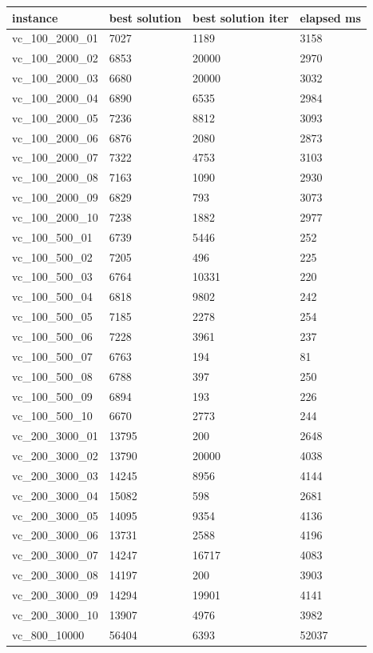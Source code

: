 \documentclass[11pt]{article}
\begin{document}
\begin{table}[!ht]
    \centering
    \begin{tabular}{|l|l|l|l|}
    \hline
        instance & best solution & best solution iter & elapsed ms \\ \hline

        
        vc\_100\_2000\_01 & 7027 & 1189 & 3158 \\ \hline
        vc\_100\_2000\_02 & 6853 & 20000 & 2970 \\ \hline
        vc\_100\_2000\_03 & 6680 & 20000 & 3032 \\ \hline
        vc\_100\_2000\_04 & 6890 & 6535 & 2984 \\ \hline
        vc\_100\_2000\_05 & 7236 & 8812 & 3093 \\ \hline
        vc\_100\_2000\_06 & 6876 & 2080 & 2873 \\ \hline
        vc\_100\_2000\_07 & 7322 & 4753 & 3103 \\ \hline
        vc\_100\_2000\_08 & 7163 & 1090 & 2930 \\ \hline
        vc\_100\_2000\_09 & 6829 & 793 & 3073 \\ \hline
        vc\_100\_2000\_10 & 7238 & 1882 & 2977 \\ \hline
        vc\_100\_500\_01 & 6739 & 5446 & 252 \\ \hline
        vc\_100\_500\_02 & 7205 & 496 & 225 \\ \hline
        vc\_100\_500\_03 & 6764 & 10331 & 220 \\ \hline
        vc\_100\_500\_04 & 6818 & 9802 & 242 \\ \hline
        vc\_100\_500\_05 & 7185 & 2278 & 254 \\ \hline
        vc\_100\_500\_06 & 7228 & 3961 & 237 \\ \hline
        vc\_100\_500\_07 & 6763 & 194 & 81 \\ \hline
        vc\_100\_500\_08 & 6788 & 397 & 250 \\ \hline
        vc\_100\_500\_09 & 6894 & 193 & 226 \\ \hline
        vc\_100\_500\_10 & 6670 & 2773 & 244 \\ \hline
        vc\_200\_3000\_01 & 13795 & 200 & 2648 \\ \hline
        vc\_200\_3000\_02 & 13790 & 20000 & 4038 \\ \hline
        vc\_200\_3000\_03 & 14245 & 8956 & 4144 \\ \hline
        vc\_200\_3000\_04 & 15082 & 598 & 2681 \\ \hline
        vc\_200\_3000\_05 & 14095 & 9354 & 4136 \\ \hline
        vc\_200\_3000\_06 & 13731 & 2588 & 4196 \\ \hline
        vc\_200\_3000\_07 & 14247 & 16717 & 4083 \\ \hline
        vc\_200\_3000\_08 & 14197 & 200 & 3903 \\ \hline
        vc\_200\_3000\_09 & 14294 & 19901 & 4141 \\ \hline
        vc\_200\_3000\_10 & 13907 & 4976 & 3982 \\ \hline
        vc\_800\_10000 & 56404 & 6393 & 52037 \\ \hline


\end{tabular}
\end{table}
\end{document}
